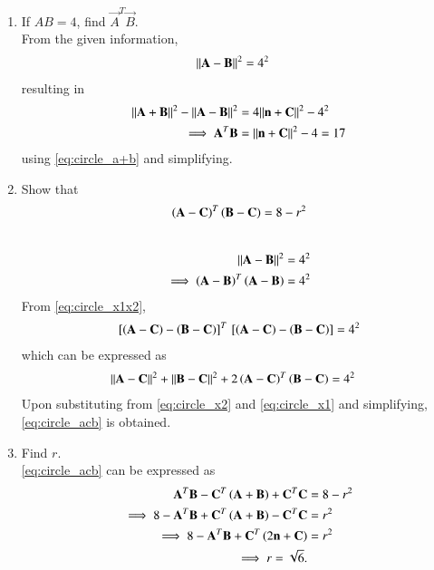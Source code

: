 \documentclass[journal,12pt,twocolumn]{IEEEtran}
\renewcommand\thesection{\arabic{section}}
\begin{document}
\begin{enumerate}[label=\thesection.\arabic*
,ref=\thesection.\theenumi]
\begin{align}
\\
\implies \vec{n}^T\vec{A}+\vec{n}^T\vec{B}-2\vec{n}^T\vec{C} &= k\vec{n}^T\vec{n}
\\
\implies \frac{\vec{n}^T\vec{A}+\vec{n}^T\vec{B}-2\vec{n}^T\vec{C}}{\vec{n}^T\vec{n}} &= k
\\
\implies k &= 2
\end{align}
using \eqref{eq:circle_abtangent}.
Substituting in \eqref{eq:circle_abkn}
\begin{align}
\vec{A}+\vec{B} &= 2\brak{\vec{n}+\vec{C}}
\label{eq:circle_a+b}
\end{align}
%
\item If $AB = 4$, find $\vec{A}^T\vec{B}$.
%
\\
\solution From the given information,
\begin{align}
\lVert\mathbf{A}-\mathbf{B}\rVert^2 &= 4^2
\end{align}
resulting in
\begin{align}
\lVert\mathbf{A}+\mathbf{B}\rVert^2-\lVert\mathbf{A}-\mathbf{B}\rVert^2 &= 4\lVert\mathbf{n}+\mathbf{C}\rVert^2-4^2
\\
\implies\mathbf{A}^T\mathbf{B} &= \lVert\mathbf{n}+\mathbf{C}\rVert^2-4 = 17
\end{align}
using \eqref{eq:circle_a+b} and simplifying.
%
\item Show that
\begin{equation}
\label{eq:circle_acb}
\left(\mathbf{A}-\mathbf{C}\right)^T\left(\mathbf{B}-\mathbf{C}\right) =8 - r^2
\end{equation}
\\
\solution
\begin{align}
\lVert\mathbf{A}-\mathbf{B}\rVert^2 &= 4^2
\\
\implies\left(\mathbf{A}-\mathbf{B}\right)^T\left( \mathbf{A}-\mathbf{B} \right) &= 4^2
\label{eq:circle_x1x2}
\end{align}
%
From \eqref{eq:circle_x1x2},
\begin{align}
{}\left[\left(\mathbf{A}-\mathbf{C}\right)-\left(\mathbf{B}- \mathbf{C}\right)\right]^T{}\left[ 
\left(\mathbf{A}-\mathbf{C}\right)-\left(\mathbf{B}- \mathbf{C}\right)\right] = 4^2
\end{align}
%
which can be expressed as
\begin{align}
\lVert\mathbf{A}-\mathbf{C}\rVert^2+\lVert\mathbf{B}-\mathbf{C}\rVert^2 &
+ 2\left(\mathbf{A}-\mathbf{C}\right)^T\left(\mathbf{B}-\mathbf{C}\right) 
= 4^2
\end{align}
Upon substituting from \eqref{eq:circle_x2} and  \eqref{eq:circle_x1} and simplifying, \eqref{eq:circle_acb}
is obtained.
\item Find $r$.
\\
\solution \eqref{eq:circle_acb} can be expressed as
\begin{align}
 \mathbf{A}^T\mathbf{B}  -\mathbf{C}^T\left(\mathbf{A}+\mathbf{B}\right)+\mathbf{C}^T\mathbf{C} &=8 - r^2
\\
\implies 8 - \mathbf{A}^T\mathbf{B}  +\mathbf{C}^T\left(\mathbf{A}+\mathbf{B}\right)-\mathbf{C}^T\mathbf{C} &= r^2
\\
\implies 8 - \mathbf{A}^T\mathbf{B}  +\mathbf{C}^T\left(2\mathbf{n}+\mathbf{C}\right) &= r^2
\\
\implies r =  \sqrt{6}.
\end{align}

\end{enumerate}
%
\end{document}
